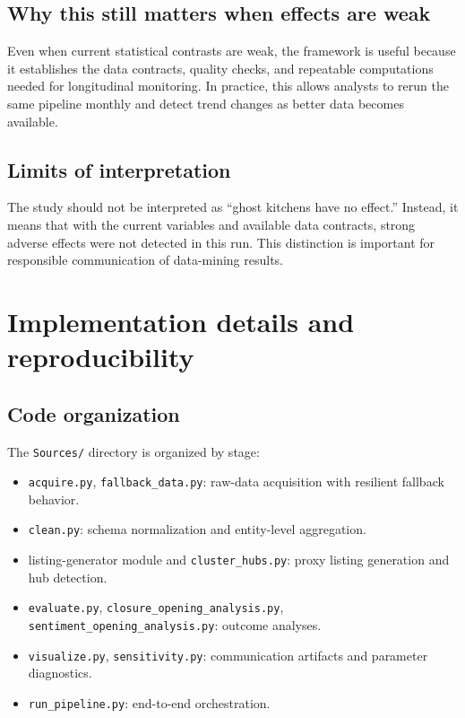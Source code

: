 \documentclass[10pt,twocolumn]{article}
\begin{document}
\subsection{Why this still matters when effects are weak}
Even when current statistical contrasts are weak, the framework is useful because it establishes the data contracts, quality checks, and repeatable computations needed for longitudinal monitoring. In practice, this allows analysts to rerun the same pipeline monthly and detect trend changes as better data becomes available.

\subsection{Limits of interpretation}
The study should not be interpreted as ``ghost kitchens have no effect.'' Instead, it means that with the current variables and available data contracts, strong adverse effects were not detected in this run. This distinction is important for responsible communication of data-mining results.

\section{Implementation details and reproducibility}
\subsection{Code organization}
The \texttt{Sources/} directory is organized by stage:
\begin{itemize}
\item \texttt{acquire.py}, \texttt{fallback\_data.py}: raw-data acquisition with resilient fallback behavior.
\item \texttt{clean.py}: schema normalization and entity-level aggregation.
\item listing-generator module and \texttt{cluster\_hubs.py}: proxy listing generation and hub detection.
\item \texttt{evaluate.py}, \texttt{closure\_opening\_analysis.py}, \texttt{sentiment\_opening\_analysis.py}: outcome analyses.
\item \texttt{visualize.py}, \texttt{sensitivity.py}: communication artifacts and parameter diagnostics.
\item \texttt{run\_pipeline.py}: end-to-end orchestration.
\end{itemize}
\end{document}
